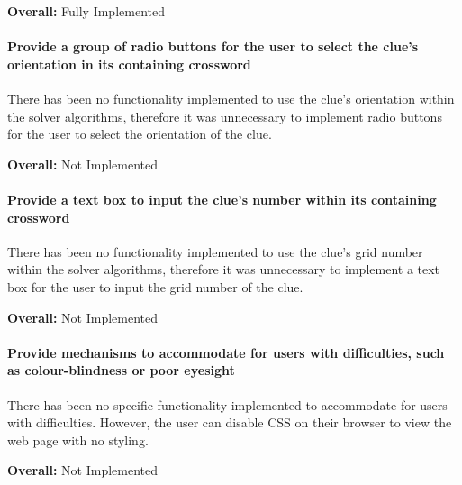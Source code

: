 {\bf Overall:} Fully Implemented


\paragraph{Provide a group of radio buttons for the user to select the clue's
orientation in its containing crossword}

There has been no functionality implemented to use the clue's orientation
within the solver algorithms, therefore it was unnecessary to implement radio
buttons for the user to select the orientation of the clue.

{\bf Overall:} Not Implemented


\paragraph{Provide a text box to input the clue's number within its containing
crossword}

There has been no functionality implemented to use the clue's grid number
within the solver algorithms, therefore it was unnecessary to implement a text
box for the user to input the grid number of the clue.
 
{\bf Overall:} Not Implemented


\paragraph{Provide mechanisms to accommodate for users with difficulties, such
as colour-blindness or poor eyesight}
    
There has been no specific functionality implemented to accommodate for users
with difficulties. However, the user can disable CSS on their browser to view
the web page with no styling.

{\bf Overall:} Not Implemented
